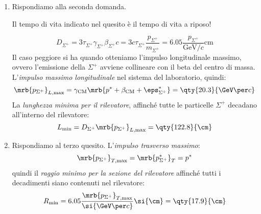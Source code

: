 \begin{example}
\begin{enumerate}
		\item Rispondiamo alla seconda domanda.
		      \begin{note}
			      Il tempo di vita indicato nel quesito è il tempo di vita a riposo!
		      \end{note}
		      \begin{equation}
			      D _{\Sigma^+}
			      = 3 \tau _{\Sigma^+} \gamma _{\Sigma^+} \beta _{\Sigma^+} c
			      = 3 c \tau _{\Sigma^+} \frac{p _{\Sigma^+}}{m _{\Sigma^+}}
			      = 6.05 \frac{p _{\Sigma^+}}{\si{\GeV \per c}} \si{\cm}
		      \end{equation}
		      Il caso peggiore si ha quando otteniamo l'impulso longitudinale
		      massimo, ovvero l'emissione della $\Sigma^+$ avviene collineare con
		      il beta del centro di massa.
		      L'\textit{impulso massimo longitudinale} nel sistema del laboratorio,
		      quindi:
		      \begin{equation}
			      \mrb{p _{\Sigma^+}} _{L, \text{max}}
			      = \gamma _\text{CM} \mrb{p ^{\ast} + \beta _\text{CM}
				      + \eps _{\Sigma^+}^{\ast}}
			      = \qty{20.3}{\GeV \per c}
		      \end{equation}
		      La \textit{lunghezza minima per il rilevatore}, affinché tutte
		      le particelle $\Sigma^+$ decadano all'interno del rilevatore:
		      \begin{equation}
			      L _\text{min}
			      = D _{\Sigma^+} \mrb{p _{\Sigma^+}}_{L, \text{max}}
			      = \qty{122.8}{\cm}
		      \end{equation}

		\item Rispondiamo al terzo quesito. L'\textit{impulso trasverso massimo}:
		      \begin{equation}
			      \mrb{p _{\Sigma^+}}_{T, \text{max}}
			      = \mrb{p _{\Sigma^+}^{\ast}}_{T}
			      = p^\ast
		      \end{equation}
		      quindi il \textit{raggio minimo per la sezione del rilevatore}
		      affinché tutti i decadimenti siano contenuti nel rilevatore:
		      \begin{equation}
			      R _\text{min}
			      = 6.05 \frac{
				      \mrb{p _{\Sigma^+}}_{T, \text{max}}
			      }{
				      \si{\GeV \per c}} \si{\cm
			      }
			      = \qty{17.9}{\cm}
		      \end{equation}


\end{enumerate}
\end{example}

